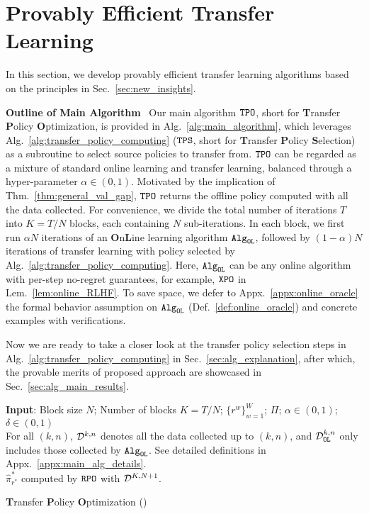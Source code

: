 \section{Provably Efficient Transfer Learning}\label{sec:main_theory}
In this section, we develop provably efficient transfer learning algorithms based on the principles in Sec.~\ref{sec:new_insights}.

\textbf{Outline of Main Algorithm}~
Our main algorithm ${\texttt{TPO}}$, short for \textbf{T}ransfer \textbf{P}olicy \textbf{O}ptimization, is provided in Alg.~\ref{alg:main_algorithm}, which leverages Alg.~\ref{alg:transfer_policy_computing} (${{\texttt{TPS}}}$, short for \textbf{T}ransfer \textbf{P}olicy \textbf{S}election) as a subroutine to select source policies to transfer from.
${\texttt{TPO}}$ can be regarded as a mixture of standard online learning and transfer learning, balanced through a hyper-parameter $\alpha \in (0, 1)$.
Motivated by the implication of Thm.~\ref{thm:general_val_gap}, ${\texttt{TPO}}$ returns the offline policy computed with all the data collected.
For convenience, we divide the total number of iterations $T$ into $K=T/N$ blocks, each containing $N$ sub-iterations.
In each block, we first run $\alpha N$ iterations of an \textbf{{O}}n\textbf{{L}}ine learning algorithm $\texttt{Alg}_{\texttt{OL}}$, followed by $(1-\alpha)N$ iterations of transfer learning with policy selected by Alg.~\ref{alg:transfer_policy_computing}.
Here, $\texttt{Alg}_{\texttt{OL}}$ can be any online algorithm with per-step no-regret guarantees, for example, ${\texttt{XPO}}$ in Lem.~\ref{lem:online_RLHF}.
To save space, we defer to Appx.~\ref{appx:online_oracle} the formal behavior assumption on $\texttt{Alg}_{\texttt{OL}}$ (Def.~\ref{def:online_oracle}) and concrete examples with verifications.

Now we are ready to take a closer look at the transfer policy selection steps in Alg.~\ref{alg:transfer_policy_computing} in Sec.~\ref{sec:alg_explanation}, after which, the provable merits of proposed approach are showcased in Sec.~\ref{sec:alg_main_results}.
\begin{algorithm*}[t]
    \textbf{Input}: Block size $N$; Number of blocks $K = T / N$; $\{r^w\}_{w=1}^W$; $\Pi$; $\alpha \in (0,1)$; $\delta\in(0,1)$ \\
    For all $(k,n)$, 
    $\mathcal{D}^{k,n}$ denotes all the data collected up to $(k,n)$, and $\mathcal{D}^{k,n}_{\texttt{OL}}$ only includes those collected by $\texttt{Alg}_{\texttt{OL}}$. See detailed definitions in Appx.~\ref{appx:main_alg_details}.\\
    \Return $\hat{\pi}^*_{r^*}$ computed by ${\texttt{RPO}}$ with $\mathcal{D}^{K,N+1}$.
    \caption{\textbf{T}ransfer \textbf{P}olicy \textbf{O}ptimization (\TPO)}\label{alg:main_algorithm}
\end{algorithm*}

